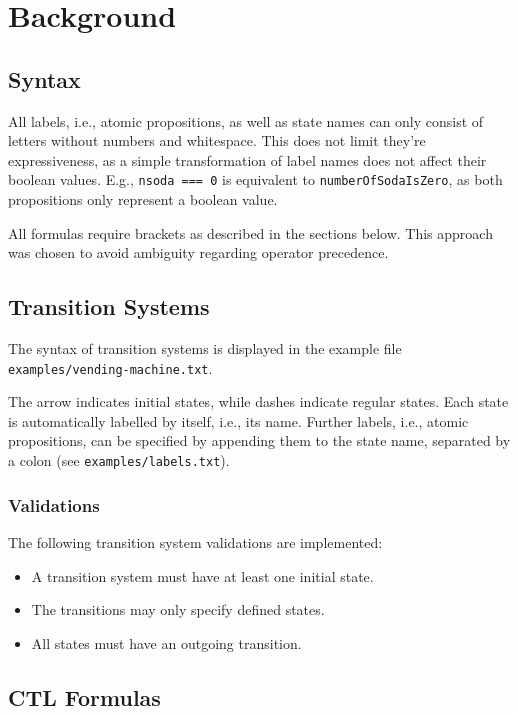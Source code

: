 \documentclass[11pt]{article}
\begin{document}
\section{Background}

\subsection{Syntax}

All labels, i.e., atomic propositions, as well as state names can only consist of letters without numbers and whitespace.
This does not limit they're expressiveness, as a simple transformation of label names does not affect their boolean values.
E.g., \verb|nsoda === 0| is equivalent to \verb|numberOfSodaIsZero|, as both propositions only represent a boolean value.

All formulas require brackets as described in the sections below.
This approach was chosen to avoid ambiguity regarding operator precedence.

\subsection{Transition Systems}

The syntax of transition systems is displayed in the example file \verb|examples/vending-machine.txt|.

The arrow indicates initial states, while dashes indicate regular states.
Each state is automatically labelled by itself, i.e., its name.
Further labels, i.e., atomic propositions, can be specified by appending them to the state name, separated by a colon (see \verb|examples/labels.txt|).

\subsubsection{Validations}

The following transition system validations are implemented:

\begin{itemize}
  \item A transition system must have at least one initial state.
  \item The transitions may only specify defined states.
  \item All states must have an outgoing transition.
\end{itemize}

\subsection{CTL Formulas}
\end{document}
